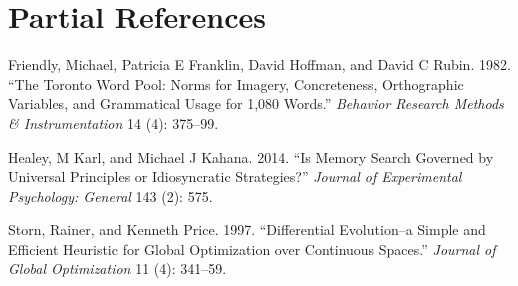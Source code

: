 \documentclass[
  letterpaper,
  DIV=11,
  numbers=noendperiod]{scrartcl}
\newlength{\cslhangindent}
\newenvironment{CSLReferences}[2] %
 {\begin{list}{}{%
  \setlength{\itemindent}{0pt}
  \setlength{\leftmargin}{0pt}
  \setlength{\parsep}{0pt}
  \ifodd #1
   \setlength{\leftmargin}{\cslhangindent}
   \setlength{\itemindent}{-1\cslhangindent}
  \fi
  \setlength{\itemsep}{#2\baselineskip}}}
 {\end{list}}
\begin{document}
\section{Partial References}\label{partial-references}

\label{refs}
\begin{CSLReferences}{1}{0}
Friendly, Michael, Patricia E Franklin, David Hoffman, and David C
Rubin. 1982. {``The Toronto Word Pool: Norms for Imagery, Concreteness,
Orthographic Variables, and Grammatical Usage for 1,080 Words.''}
\emph{Behavior Research Methods \& Instrumentation} 14 (4): 375--99.

Healey, M Karl, and Michael J Kahana. 2014. {``Is Memory Search Governed
by Universal Principles or Idiosyncratic Strategies?''} \emph{Journal of
Experimental Psychology: General} 143 (2): 575.

Storn, Rainer, and Kenneth Price. 1997. {``Differential Evolution--a
Simple and Efficient Heuristic for Global Optimization over Continuous
Spaces.''} \emph{Journal of Global Optimization} 11 (4): 341--59.

\end{CSLReferences}
\end{document}
